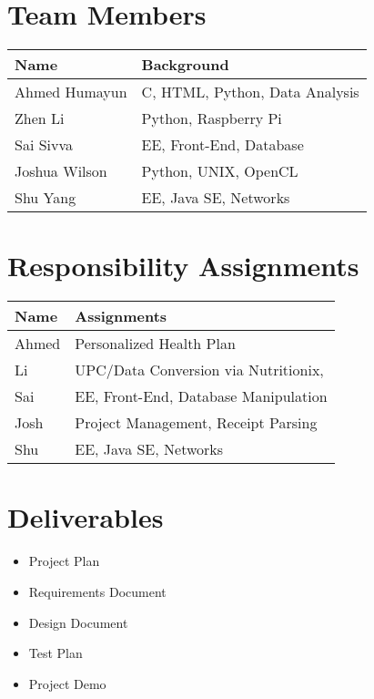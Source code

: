 \documentclass[10pt]{article}
\begin{document}
\section{Team Members}
{\ttfamily
	\begin{center}
\begin{tabular*}{\textwidth}{ m{15em} m{20em}  }		
	\toprule			
	Name  & Background \\
	\bottomrule
	\toprule
	Ahmed Humayun& C, HTML, Python, Data Analysis\\
	Zhen Li& Python, Raspberry Pi\\
	Sai Sivva&  EE, Front-End, Database \\
	Joshua Wilson&  Python, UNIX, OpenCL\\
	Shu Yang & EE, Java SE, Networks \\
	\hline		
\end{tabular*}
\end{center}
}
\pagebreak 
\section{Responsibility Assignments}
{\ttfamily
	\begin{center}
		\begin{tabular*}{\textwidth}{ m{5em} m{20em}  }		
			\toprule			
			Name  & Assignments \\
			\bottomrule
			\toprule
			Ahmed& Personalized Health Plan\\
			Li & UPC/Data Conversion via Nutritionix, \\
			Sai & EE, Front-End, Database Manipulation\\
			Josh &  Project Management, Receipt Parsing \\
			Shu  & EE, Java SE, Networks \\
			\hline		
		\end{tabular*}
	\end{center}
}

\section{Deliverables}
\begin{itemize}
	\item Project Plan
	\item Requirements Document
	\item Design Document
	\item Test Plan
	\item Project Demo
\end{itemize}
\end{document}
